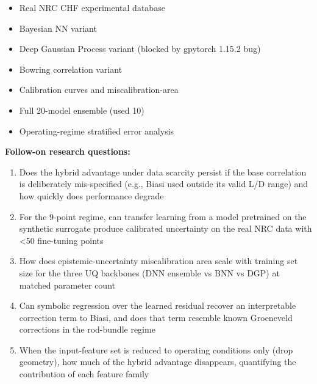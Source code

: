 \documentclass[11pt]{article}
\begin{document}
\begin{itemize}[leftmargin=1.4em,itemsep=0.2em,topsep=0.2em]
\item Real NRC CHF experimental database
\item Bayesian NN variant
\item Deep Gaussian Process variant (blocked by gpytorch 1.15.2 bug)
\item Bowring correlation variant
\item Calibration curves and miscalibration-area
\item Full 20-model ensemble (used 10)
\item Operating-regime stratified error analysis
\end{itemize}\noindent\textbf{Follow-on research questions:}
\begin{enumerate}[leftmargin=1.6em,itemsep=0.2em,topsep=0.2em,label=Q\arabic*.]
\item Does the hybrid advantage under data scarcity persist if the base correlation is deliberately mis-specified (e.g., Biasi used outside its valid L/D range) and how quickly does performance degrade
\item For the 9-point regime, can transfer learning from a model pretrained on the synthetic surrogate produce calibrated uncertainty on the real NRC data with \textless{}50 fine-tuning points
\item How does epistemic-uncertainty miscalibration area scale with training set size for the three UQ backbones (DNN ensemble vs BNN vs DGP) at matched parameter count
\item Can symbolic regression over the learned residual recover an interpretable correction term to Biasi, and does that term resemble known Groeneveld corrections in the rod-bundle regime
\item When the input-feature set is reduced to operating conditions only (drop geometry), how much of the hybrid advantage disappears, quantifying the contribution of each feature family
\end{enumerate}
\end{document}
